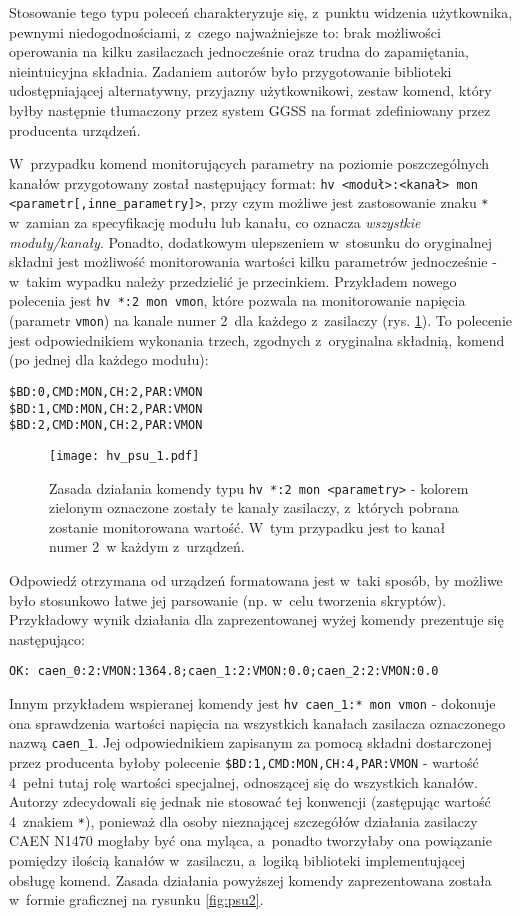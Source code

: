 Stosowanie tego typu poleceń charakteryzuje się, z~punktu widzenia użytkownika, pewnymi niedogodnościami, z~czego najważniejsze to: brak możliwości operowania na kilku zasilaczach jednocześnie oraz trudna do zapamiętania, nieintuicyjna składnia. Zadaniem autorów było przygotowanie biblioteki udostępniającej alternatywny, przyjazny użytkownikowi, zestaw komend, który byłby następnie tłumaczony przez system GGSS na format zdefiniowany przez producenta urządzeń. 

W~przypadku komend monitorujących parametry na poziomie poszczególnych kanałów przygotowany został następujący format: \lstinline{hv <moduł>:<kanał> mon <parametr[,inne_parametry]>}, przy czym możliwe jest zastosowanie znaku \lstinline{*} w~zamian za specyfikację modułu lub kanału, co oznacza \emph{wszystkie moduły/kanały}. Ponadto, dodatkowym ulepszeniem w~stosunku do oryginalnej składni jest możliwość monitorowania wartości kilku parametrów jednocześnie - w~takim wypadku należy przedzielić je przecinkiem. Przykładem nowego polecenia jest \lstinline{hv *:2 mon vmon}, które pozwala na monitorowanie napięcia (parametr \lstinline{vmon}) na kanale numer 2~dla każdego z~zasilaczy (rys. \ref{fig:psu1}). To polecenie jest odpowiednikiem wykonania trzech, zgodnych z~oryginalna składnią, komend (po jednej dla każdego modułu):
\begin{lstlisting}
$BD:0,CMD:MON,CH:2,PAR:VMON
$BD:1,CMD:MON,CH:2,PAR:VMON
$BD:2,CMD:MON,CH:2,PAR:VMON
\end{lstlisting}

\begin{figure}[H]
\centering
\texttt{[image: hv\_psu\_1.pdf]}
\caption{Zasada działania komendy typu \lstinline{hv *:2 mon <parametry>} - kolorem zielonym oznaczone zostały te kanały zasilaczy, z~których pobrana zostanie monitorowana wartość. W~tym przypadku jest to kanał numer 2~w każdym z~urządzeń.}
\label{fig:psu1}
\end{figure}

Odpowiedź otrzymana od urządzeń formatowana jest w~taki sposób, by możliwe było stosunkowo łatwe jej parsowanie (np. w~celu tworzenia skryptów). Przykładowy wynik działania dla zaprezentowanej wyżej komendy prezentuje się następująco:
\begin{lstlisting}
OK: caen_0:2:VMON:1364.8;caen_1:2:VMON:0.0;caen_2:2:VMON:0.0
\end{lstlisting}

Innym przykładem wspieranej komendy jest \lstinline{hv caen_1:* mon vmon} - dokonuje ona sprawdzenia wartości napięcia na wszystkich kanałach zasilacza oznaczonego nazwą \lstinline{caen_1}. Jej odpowiednikiem zapisanym za pomocą składni dostarczonej przez producenta byłoby polecenie \lstinline{$BD:1,CMD:MON,CH:4,PAR:VMON} - wartość 4~pełni tutaj rolę wartości specjalnej, odnoszącej się do wszystkich kanałów. Autorzy zdecydowali się jednak nie stosować tej konwencji (zastępując wartość 4~znakiem \lstinline{*}), ponieważ dla osoby nieznającej szczegółów działania zasilaczy CAEN N1470 mogłaby być ona myląca, a~ponadto tworzyłaby ona powiązanie pomiędzy ilością kanałów w~zasilaczu, a~logiką biblioteki implementującej obsługę komend. Zasada działania powyższej komendy zaprezentowana została w~formie graficznej na rysunku \ref{fig:psu2}.

